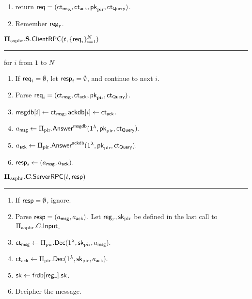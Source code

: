 \begin{definition}
\begin{enumerate}
    \item return $\mathsf{req} = (\mathsf{ct}_{\mathsf{msg}}, \mathsf{ct}_{\mathsf{ack}}, \mathsf{pk}_{\text{pir}}, \mathsf{ct}_{\mathsf{Query}})$.
    \item Remember $\mathsf{reg}_r$.
\end{enumerate}
\vspace{10pt}
$\mathbf{\Pi_{\text{asphr}}.S.\mathsf{ClientRPC}}(t, \{\mathsf{req}_i\}_{i = 1}^N)$
\vspace{5pt}
\hrule
\vspace{5pt}
\item for $i$ from $1$ to $N$
\begin{enumerate}
    \item If $\mathsf{req}_i = \emptyset$, let $\mathsf{resp}_i = \emptyset$, and continue to next $i$. 
    \item Parse $\mathsf{req}_i = (\mathsf{ct}_{\mathsf{msg}}, \mathsf{ct}_{\mathsf{ack}}, \mathsf{pk}_{\text{pir}}, \mathsf{ct}_{\mathsf{Query}})$.
    \item $\mathsf{msgdb}[i] \leftarrow \mathsf{ct}_{\mathsf{msg}}, \mathsf{ackdb}[i] \leftarrow \mathsf{ct}_{\mathsf{ack}}$.
    \item $a_{\mathsf{msg}} \leftarrow \Pi_{\text{pir}}.\mathsf{Answer}^{\mathsf{msgdb}}(1^{\lambda}, \mathsf{pk}_{\text{pir}}, \mathsf{ct}_{\mathsf{Query}}).$
    \item $a_{\mathsf{ack}} \leftarrow \Pi_{\text{pir}}.\mathsf{Answer}^{\mathsf{ackdb}}(1^{\lambda}, \mathsf{pk}_{\text{pir}}, \mathsf{ct}_{\mathsf{Query}}).$
    \item $\mathsf{resp}_i \leftarrow (a_{\mathsf{msg}}, a_{\mathsf{ack}}).$
\end{enumerate}
\vspace{10pt}
$\mathbf{\Pi_{\text{asphr}}.C.\mathsf{ServerRPC}}(t, \mathsf{resp})$
\vspace{5pt}
\hrule
\vspace{5pt}
\begin{enumerate}
    \item If $\mathsf{resp} = \emptyset$, ignore.
    \item Parse $\mathsf{resp} = (a_{\mathsf{msg}}, a_{\mathsf{ack}})$. Let $\mathsf{reg}_r, {\mathsf{sk}}_{\text{pir}}$ be defined in the last call to $\Pi_{\text{asphr}}.C.\mathsf{Input}$.
    \item $\mathsf{ct}_{\mathsf{msg}} \leftarrow \Pi_{\text{pir}}.\mathsf{Dec}(1^{\lambda}, {\mathsf{sk}}_{\text{pir}}, a_{\mathsf{msg}}).$
    \item $\mathsf{ct}_{\mathsf{ack}} \leftarrow \Pi_{\text{pir}}.\mathsf{Dec}(1^{\lambda}, {\mathsf{sk}}_{\text{pir}}, a_{\mathsf{ack}}).$
    \item ${\mathsf{sk}} \leftarrow \mathsf{frdb}[\mathsf{reg}_r].{\mathsf{sk}}$.
    \item Decipher the message.
    \begin{enumerate}

\end{enumerate}
\end{enumerate}
\end{definition}
